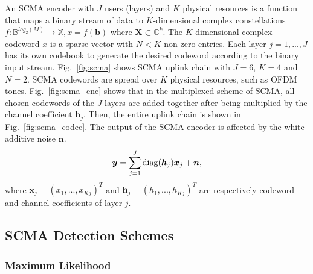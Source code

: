 An SCMA encoder with $J$ users (layers) and $K$ physical resources is a function
that maps a binary stream of data to $K$-dimensional complex constellations
$f : \mathbb{B}^{log_{2}(M)} \rightarrow \mathbb{X}, x = f(\bm{b})$ where
$\bm{X} \subset \mathbb{C}^k$. The $K$-dimensional complex codeword $x$ is a
sparse vector with $N < K$ non-zero entries. Each layer $j=1, ..., J$ has its
own codebook to generate the desired codeword according to the binary input
stream. Fig.~\ref{fig:scma} shows SCMA uplink chain with $J = 6$, $K = 4$ and
$N = 2$. SCMA codewords are spread over $K$ physical resources, such as OFDM
tones. Fig.~\ref{fig:scma_enc} shows that in the multiplexed scheme of SCMA, all
chosen codewords of the $J$ layers are added together after being multiplied by
the channel coefficient $\bm{h}_j$. Then, the entire uplink chain is shown in
Fig.~\ref{fig:scma_codec}. The output of the SCMA encoder is affected by the
white additive noise $\bm{n}$.
\begin{equation}
  \label{eq:scma_1}
  \bm{y} = \sum\limits_{j=1}^J \operatorname{diag}(\bm{h}_j)\bm{x}_j+\bm{n},
\end{equation}
where $\bm{x}_j=(x_1,...,x_{Kj})^T$ and $\bm{h}_j=(h_1,...,h_{Kj})^T$ are
respectively codeword and channel coefficients of layer $j$.

\subsection{SCMA Detection Schemes}
\label{sec:scma_detection}

\subsubsection{Maximum Likelihood}
\label{sec:scma_ml}

